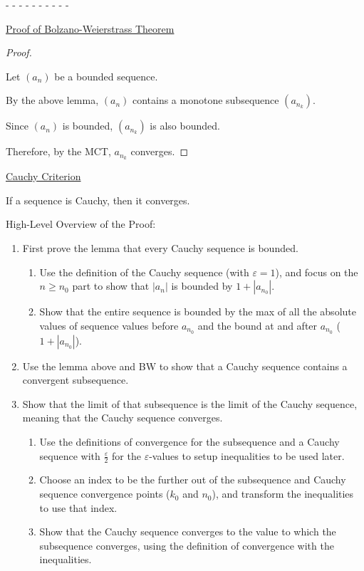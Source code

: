 \documentclass[12pt]{article}
\newcommand\abs[1]{\left| #1 \right|} %
\newcommand{\eps}{\varepsilon}
\begin{document}
- - - - - - - - - -

\underline{Proof of Bolzano-Weierstrass Theorem}

\begin{proof}
$ $

Let $(a_n)$ be a bounded sequence.

By the above lemma, $(a_n)$ contains a monotone subsequence $(a_{n_k})$.

Since $(a_n)$ is bounded, $(a_{n_k})$ is also bounded.

Therefore, by the MCT, $a_{n_k}$ converges.
\end{proof}

\pagebreak

\underline{Cauchy Criterion}

If a sequence is Cauchy, then it converges.

\dotfill

High-Level Overview of the Proof:

\begin{enumerate}
\item First prove the lemma that every Cauchy sequence is bounded.
\begin{enumerate}
\item Use the definition of the Cauchy sequence (with $\eps = 1$), and focus on the $n \ge n_0$ part to show that $\abs{a_n}$ is bounded by $1 + \abs{a_{n_0}}$.

\item Show that the entire sequence is bounded by the max of all the absolute values of sequence values before $a_{n_0}$ and the bound at and after $a_{n_0}$ ($1 + \abs{a_{n_0}}$).
\end {enumerate}

\item Use the lemma above and BW to show that a Cauchy sequence contains a convergent subsequence.

\item Show that the limit of that subsequence is the limit of the Cauchy sequence, meaning that the Cauchy sequence converges.
\begin{enumerate}
\item Use the definitions of convergence for the subsequence and a Cauchy sequence with $\frac{\eps}{2}$ for the $\eps$-values to setup inequalities to be used later.

\item Choose an index to be the further out of the subsequence and Cauchy sequence convergence points ($k_0$ and $n_0$), and transform the inequalities to use that index.

\item Show that the Cauchy sequence converges to the value to which the subsequence converges, using the definition of convergence with the inequalities.
\end{enumerate}
\end{enumerate}
\end{document}
